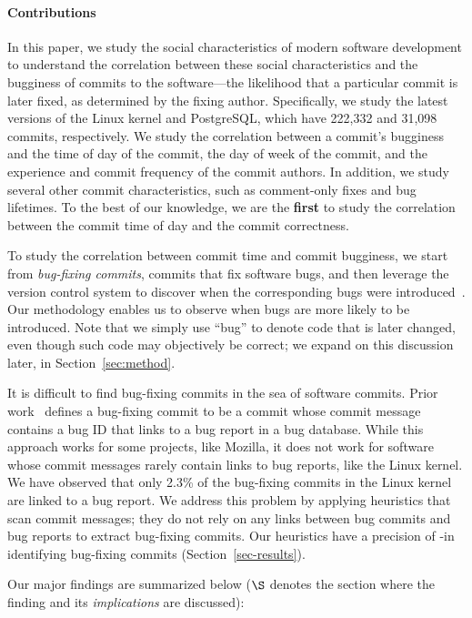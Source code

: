\paragraph{Contributions}

In this paper, we study the social characteristics of modern software
development to understand the correlation between these social characteristics
and the bugginess of commits to the software---the likelihood that a
particular commit is later fixed, as determined by the fixing author.
Specifically, we study the latest versions of the Linux kernel and PostgreSQL,
which have 222,332 and 31,098 commits, respectively. We study the correlation
between a commit's bugginess and the time of day of the commit, the day of week
of the commit, and the experience and commit frequency of the commit authors.
In addition, we study several other commit characteristics, such as comment-only
fixes and bug lifetimes. To the best of our knowledge, we are the {\bf first}
to study the correlation between the commit time of day and the commit
correctness.

To study the correlation between commit time and commit bugginess, we start from
{\em bug-fixing commits}, commits that fix software bugs, and then leverage the
version control system to discover when the corresponding bugs were
introduced~\cite{sliwerski-msr-2005}. Our methodology enables us to observe
when bugs are more likely to be introduced. Note that we simply use ``bug'' to
denote code that is later changed, even though such code may objectively be
correct; we expand on this discussion later, in Section~\ref{sec:method}.

It is difficult to find bug-fixing commits in the sea of software commits.
Prior work~\cite{sliwerski-msr-2005} defines a bug-fixing commit to be a commit
whose commit message contains a bug ID that links to a bug report in a bug
database. While this approach works for some projects, like Mozilla, it does not
work for software whose commit messages rarely contain links to bug reports,
like the Linux kernel. We have observed that only 2.3\% of the bug-fixing
commits in the Linux kernel are linked to a bug report. We address this problem
by applying heuristics that scan commit messages; they do not rely on any links
between bug commits and bug reports to extract bug-fixing commits. Our
heuristics have a precision of \postP-\linuxP in identifying bug-fixing commits
(Section~\ref{sec-results}).

Our major findings are summarized below ($\S$ denotes the section where the
finding and its {\em implications} are discussed):

